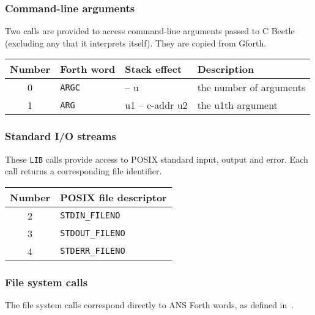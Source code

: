 \documentclass[english]{article}
\newcommand{\spic}[1]{{\spfont\setlength{\baselineskip}{\normalbaselineskip}#1\/}}
\begin{document}
\subsubsection{Command-line arguments}

Two calls are provided to access command-line arguments passed to C Beetle (excluding any that it interprets itself). They are copied from Gforth.

\begin{center}
\begin{tabular}{S[table-format=2.0]lll} \toprule
\bf Number & \bf Forth word & \bf Stack effect & \bf Description \\  & {\tt ARGC} & \spic{-- u} & the number of arguments \\
1 & {\tt ARG} & \spic{u1 -- c-addr u2} & the \spic{u1}th argument \\ \bottomrule
\end{tabular}
\end{center}

\subsubsection{Standard I/O streams}

These {\tt LIB} calls provide access to POSIX standard input, output and error. Each call returns a corresponding file identifier.

\begin{center}
\begin{tabular}{S[table-format=2.0]l} \toprule
\bf Number & \bf POSIX file descriptor \\  & {\tt STDIN\_FILENO} \\
3 & {\tt STDOUT\_FILENO} \\
4 & {\tt STDERR\_FILENO} \\ \bottomrule
\end{tabular}
\end{center}

\subsubsection{File system calls}

The file system calls correspond directly to ANS Forth words, as defined in~\cite{ANSIforth}.
\end{document}
